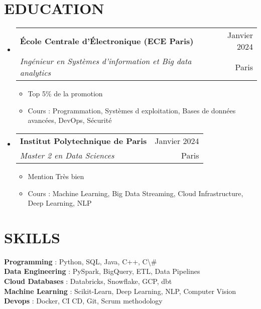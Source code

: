 \documentclass[letterpaper,11pt]{article}
\makeatletter
\newcommand{\resumeItem}[1]{
  \item\small{
    {#1 \vspace{-1pt}}
  }
}
\newcommand{\resumeSubheading}[4]{
  \vspace{-1pt}\item
    \begin{tabular*}{\textwidth}[t]{l@{\extracolsep{\fill}}r}
      \textbf{#1} & {\color{dark-grey}\small #2}\vspace{1pt}\\
      \textit{#3} & {\color{dark-grey} \small #4}\\
    \end{tabular*}\vspace{-4pt}
}
\newcommand{\resumeSubHeadingListStart}{\begin{itemize}[leftmargin=0in, label={}]}
\newcommand{\resumeSubHeadingListEnd}{\end{itemize}}
\newcommand{\resumeItemListStart}{\begin{itemize}[label={\textbullet}]}
\newcommand{\resumeItemListEnd}{\end{itemize}\vspace{0pt}}
\makeatother
\begin{document}
\section{EDUCATION}
\resumeSubHeadingListStart
    \resumeSubheading
      {École Centrale d'Électronique (ECE Paris)}{Janvier 2024}
      {Ingénieur en Systèmes d'information et Big data analytics}{Paris}
      \resumeItemListStart
        \resumeItem{Top 5\% de la promotion}
        \resumeItem{Cours : Programmation, Syst\`{e}mes d exploitation, Bases de donn\'{e}es avanc\'{e}es, DevOps, S\'{e}curit\'{e}}
      \resumeItemListEnd
    \resumeSubheading
      {Institut Polytechnique de Paris}{Janvier 2024}
      {Master 2 en Data Sciences}{Paris}
      \resumeItemListStart
        \resumeItem{Mention Tr\`{e}s bien}
        \resumeItem{Cours : Machine Learning, Big Data Streaming, Cloud Infrastructure, Deep Learning, NLP}
      \resumeItemListEnd
  \resumeSubHeadingListEnd

\section{SKILLS}
\begin{itemize}[leftmargin=0in, label={}]
\small{\item{
     \textbf{Programming} {: Python, SQL, Java, C++, C\textbackslash{}#}\vspace{2pt} \\
     \textbf{Data Engineering} {: PySpark, BigQuery, ETL, Data Pipelines}\vspace{2pt} \\
     \textbf{Cloud Databases} {: Databricks, Snowflake, GCP, dbt}\vspace{2pt} \\
     \textbf{Machine Learning} {: Scikit-Learn, Deep Learning, NLP, Computer Vision}\vspace{2pt} \\
     \textbf{Devops} {: Docker, CI CD, Git, Scrum methodology}
}}
\end{itemize}
\end{document}
